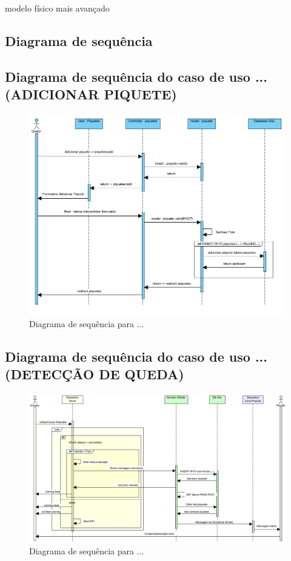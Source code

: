 modelo físico mais avançado

\subsection{Diagrama de sequência}

\subsection{Diagrama de sequência do caso de uso ...(ADICIONAR PIQUETE)}



\begin{figure}[!htb]
	\centering
	\includegraphics[width=\textwidth]{figuras/sequence_diagram_gestor.png}
	\caption{Diagrama de sequência para ...}
	\label{fig:sequência_gestor}
\end{figure}

\subsection{Diagrama de sequência do caso de uso ...(DETECÇÃO DE QUEDA)}



\begin{figure}[!htb]
	\centering
	\includegraphics[width=\textwidth]{figuras/sequence_diagram_system_2.png}
	\caption{Diagrama de sequência para ...}
	\label{fig:sequência_sistema}
\end{figure}

